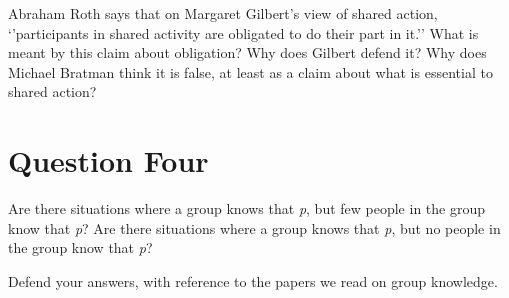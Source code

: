\documentclass[11pt,]{article}
\begin{document}
Abraham Roth says that on Margaret Gilbert's view of shared action,
`'participants in shared activity are obligated to do their part in
it.'' What is meant by this claim about obligation? Why does Gilbert
defend it? Why does Michael Bratman think it is false, at least as a
claim about what is essential to shared action?

\hypertarget{question-four}{%
\section{Question Four}\label{question-four}}

Are there situations where a group knows that \emph{p}, but few people
in the group know that \emph{p}? Are there situations where a group
knows that \emph{p}, but no people in the group know that \emph{p}?

Defend your answers, with reference to the papers we read on group
knowledge.
\end{document}
